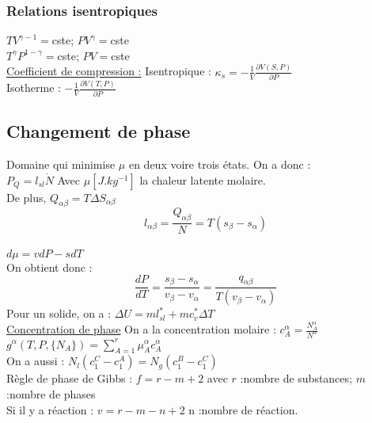 \documentclass[../main.tex]{subfiles}
\begin{document}
\subsubsection{Relations isentropiques}
$TV^{\gamma -1} =$cste; $PV^{\gamma} =$cste \\
$T^{\gamma}P^{1-\gamma} =$cste; $PV =$cste\\

\quad \underline{Coefficient de compression :}
Isentropique : $\kappa_s = -\frac{1}{V} \frac{\partial V(S,P)}{\partial P}$\\
Isotherme : $-\frac{1}{V} \frac{\partial V(T,P)}{\partial P}$\\

\subsection{Changement de phase}
Domaine qui minimise $\mu$ en deux voire trois états. On a donc :\\
$P_Q = l_{sl} \dot{N}$ Avec $\mu [J.kg^{-1}]$ la chaleur latente molaire.\\
De plus, $Q_{\alpha \beta} = T \Delta S_{\alpha \beta}$\\
\begin{equation}
    l_{\alpha \beta} = \frac{Q_{\alpha \beta}}{N} = T(s_{\beta} - s_{\alpha})
\end{equation}\\
$d\mu = vdP-sdT$\\

On obtient donc :\\
\begin{equation}
    \frac{dP}{dT} = \frac{s_{\beta}-s_{\alpha}}{v_{\beta}-v_{\alpha}} = \frac{q_{\alpha \beta}}{T(v_{\beta} - v_{\alpha})}
\end{equation}
Pour un solide, on a : $\Delta U = m l_{sl}^* + mc_v^*\Delta T$\\

\quad \underline{Concentration de phase}
On a la concentration molaire : $c_A^{\alpha} = \frac{N_A^{\alpha}}{N^{\alpha}}$\\
$g^{\alpha}(T,P, \{N_A\}) = \sum_{A=1}^r \mu_A^{\alpha} c_A^{\alpha}$\\
On a aussi : $N_l (c_1^C - c_1^A) = N_g(c_1^B-c_1^C)$\\
Règle de phase de Gibbs : $f=r-m+2$ avec $r$ :nombre de substances; $m$ :nombre de phases\\
Si il y a réaction : $v = r-m-n+2$ n :nombre de réaction.\\
\end{document}
